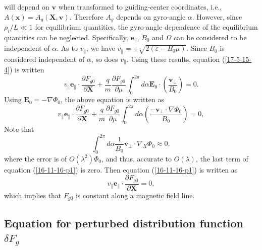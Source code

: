 \documentclass{llncs}
\begin{document}
will depend on $\mathbf{v}$ when transformed to guiding-center coordinates,
i.e., $A (\mathbf{x}) = A_g (\mathbf{X}, \mathbf{v})$. Therefore $A_g$ depends
on gyro-angle $\alpha$. However, since $\rho_i / L \ll 1$ for equilibrium
quantities, the gyro-angle dependence of the equilibrium quantities can be
neglected. Specifically, $\mathbf{e}_{\parallel}$, $B_0$ and $\Omega$ can be
considered to be independent of $\alpha$. As to $v_{\parallel}$, we have
$v_{\parallel} = \pm \sqrt{2 (\varepsilon - B_0 \mu)}$. Since $B_0$ is
considered independent of $\alpha$, so does $v_{\parallel}$. Using these
results, equation (\ref{17-5-15-4}) is written
\begin{equation}
  v_{\parallel} \mathbf{e}_{\parallel} \cdot \frac{\partial F_{g 0}}{\partial
  \mathbf{X}} + \frac{q}{m}  \frac{\partial F_{g 0}}{\partial \mu} \int_0^{2
  \pi} d \alpha \mathbf{E}_0 \cdot \left( \frac{\mathbf{v}_{\perp}}{B_0}
  \right) = 0.
\end{equation}
Using $\mathbf{E}_0 = - \nabla \Phi_0$, the above equation is written as
\begin{equation}
  \label{16-11-16-p1} v_{\parallel} \mathbf{e}_{\parallel} \cdot
  \frac{\partial F_{g 0}}{\partial \mathbf{X}} + \frac{q}{m}  \frac{\partial
  F_{g 0}}{\partial \mu} \int_0^{2 \pi} d \alpha \left(
  \frac{-\mathbf{v}_{\perp} \cdot \nabla \Phi_0}{B_0}  \right) = 0,
\end{equation}
Note that
\begin{equation}
  \int_0^{2 \pi} d \alpha \frac{1}{B_0} \mathbf{v}_{\perp} \cdot \nabla_X
  \Phi_0 \approx 0,
\end{equation}
where the error is of $O (\lambda^2) \Phi_0$, and thus, accurate to $O
(\lambda)$, the last term of equation (\ref{16-11-16-p1}) is zero. Then
equation (\ref{16-11-16-p1}) is written as
\begin{equation}
  v_{\parallel} \mathbf{e}_{\parallel} \cdot \frac{\partial F_{g 0}}{\partial
  \mathbf{X}} = 0,
\end{equation}
which implies that $F_{g 0}$ is constant along a magnetic field line.

\subsection{Equation for perturbed distribution function $\delta F_g$}
\end{document}
